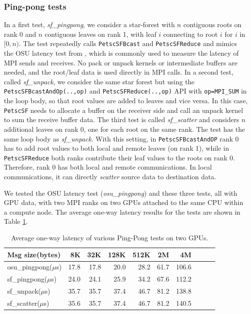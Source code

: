 \documentclass[5p,times]{elsarticle}
\begin{document}
\subsubsection{Ping-pong tests}
In a first test, \textit{sf\_pingpong}, we consider a star-forest with
$n$ contiguous roots on rank 0 and $n$ contiguous leaves on rank 1, with leaf $i$
connecting to root $i$ for $ i $ in $[0,n)$. 
The test repeatedly calls \texttt{PetscSFBcast} and
\texttt{PetscSFReduce}
and mimics the OSU latency test from \cite{OSUMicro}, which is commonly used to measure the latency of MPI sends and receives.
No pack or unpack kernels or intermediate buffers are needed, and the root/leaf data is used directly in MPI calls. %
In a second test, called \textit{sf\_unpack}, we consider the same star forest but using the \texttt{PetscSFBcastAndOp(..,op)} and
\texttt{PetscSFReduce(..,op)} API with \texttt{op=MPI\_SUM} in the loop
body, so that root values are added to leaves and vice versa. In this case,
{\tt PetscSF} needs to allocate a buffer on the receiver side and call an unpack kernel to
sum the receive buffer data. The third test is called
\textit{sf\_scatter} and considers $n$ additional leaves on rank 0, one for each root on the same rank.
The test has the same loop body as \textit{sf\_unpack}. With this setting, in
\texttt{PetscSFBcastAndOP} rank 0 has to add root values to both local
and remote leaves (on rank 1), while in \texttt{PetscSFReduce} both ranks contribute their leaf values to the roots on rank 0.
Therefore, rank 0 has both local and remote communications. In local communications, it can
directly 
\textit{scatter} 
source data to destination data.

We tested the OSU latency test (\textit{osu\_pingpong}) and these three tests, all with GPU data, with two MPI ranks on two GPUs attached to the same CPU within
a compute node. The
average one-way latency results for the tests are shown in Table
\ref{tab:pingpong}. 
\begin{table}[ht]
\small
\setlength\tabcolsep{5.5pt}
\caption{Average one-way latency of various Ping-Pong tests on two GPUs.}
\begin{tabular}{|l|r|r|r|r|r|r|r|r|r|}
\hline
Msg size(bytes)        & 8K   & 32K   & 128K   & 512K   & 2M      & 4M      \\ \hline
osu\_pingpong($\mu$s)  & 17.8 & 17.8  & 20.0   & 28.2   & 61.7    & 106.6   \\ \hline
sf\_pingpong($\mu$s)   & 24.0 & 24.1  & 25.9   & 34.2   & 67.6    & 112.2   \\ \hline
sf\_unpack($\mu$s)    & 35.7 & 35.7  & 37.4   & 46.7   & 81.2    & 138.8   \\ \hline
sf\_scatter($\mu$s)   & 35.6 & 35.7  & 37.4   & 46.7   & 81.2    & 140.5   \\ \hline
\end{tabular}
\label{tab:pingpong}
\end{table}
\end{document}
